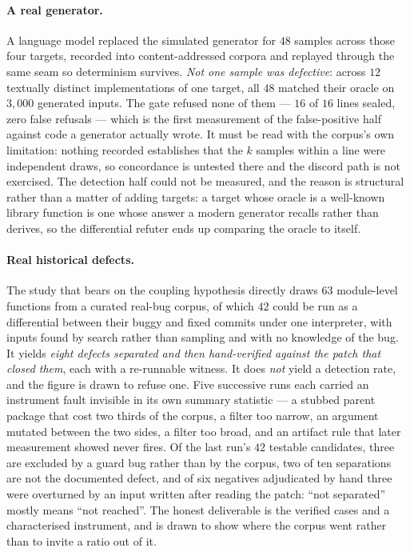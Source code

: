\documentclass[11pt,a4paper]{article}
\theoremstyle{plain}
\theoremstyle{definition}
\theoremstyle{remark}
\begin{document}
\paragraph{A real generator.} A language model replaced the simulated generator for $48$ samples across those four targets, recorded into content-addressed corpora and replayed through the same seam so determinism survives. \emph{Not one sample was defective}: across $12$ textually distinct implementations of one target, all $48$ matched their oracle on $3{,}000$ generated inputs. The gate refused none of them --- $16$ of $16$ lines sealed, zero false refusals --- which is the first measurement of the false-positive half against code a generator actually wrote. It must be read with the corpus's own limitation: nothing recorded establishes that the $k$ samples within a line were independent draws, so concordance is untested there and the discord path is not exercised. The detection half could not be measured, and the reason is structural rather than a matter of adding targets: a target whose oracle is a well-known library function is one whose answer a modern generator recalls rather than derives, so the differential refuter ends up comparing the oracle to itself.

\paragraph{Real historical defects.} The study that bears on the coupling hypothesis directly draws $63$ module-level functions from a curated real-bug corpus, of which $42$ could be run as a differential between their buggy and fixed commits under one interpreter, with inputs found by search rather than sampling and with no knowledge of the bug. It yields \emph{eight defects separated and then hand-verified against the patch that closed them}, each with a re-runnable witness. It does \emph{not} yield a detection rate, and the figure is drawn to refuse one. Five successive runs each carried an instrument fault invisible in its own summary statistic --- a stubbed parent package that cost two thirds of the corpus, a filter too narrow, an argument mutated between the two sides, a filter too broad, and an artifact rule that later measurement showed never fires. Of the last run's $42$ testable candidates, three are excluded by a guard bug rather than by the corpus, two of ten separations are not the documented defect, and of six negatives adjudicated by hand three were overturned by an input written after reading the patch: ``not separated'' mostly means ``not reached''. The honest deliverable is the verified cases and a characterised instrument, and  is drawn to show where the corpus went rather than to invite a ratio out of it.
\end{document}
